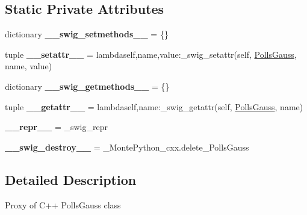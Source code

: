 \subsection*{Static Private Attributes}
\begin{DoxyCompactItemize}
\item 
\hypertarget{classMontePython__cxx_1_1PollsGauss_a8b45d199ff9407d9e15fa619c7988161}{}dictionary {\bfseries \+\_\+\+\_\+swig\+\_\+setmethods\+\_\+\+\_\+} = \{\}\label{classMontePython__cxx_1_1PollsGauss_a8b45d199ff9407d9e15fa619c7988161}

\item 
\hypertarget{classMontePython__cxx_1_1PollsGauss_ae1e5f1466ca7d3bc449f0ca09c0cdee3}{}tuple {\bfseries \+\_\+\+\_\+setattr\+\_\+\+\_\+} = lambdaself,name,value\+:\+\_\+swig\+\_\+setattr(self, \hyperlink{classMontePython__cxx_1_1PollsGauss}{Polls\+Gauss}, name, value)\label{classMontePython__cxx_1_1PollsGauss_ae1e5f1466ca7d3bc449f0ca09c0cdee3}

\item 
\hypertarget{classMontePython__cxx_1_1PollsGauss_a70d46ce4577c9f5183ec44a7185273cd}{}dictionary {\bfseries \+\_\+\+\_\+swig\+\_\+getmethods\+\_\+\+\_\+} = \{\}\label{classMontePython__cxx_1_1PollsGauss_a70d46ce4577c9f5183ec44a7185273cd}

\item 
\hypertarget{classMontePython__cxx_1_1PollsGauss_a22f83c1752260b3b05fef9189c7bec38}{}tuple {\bfseries \+\_\+\+\_\+getattr\+\_\+\+\_\+} = lambdaself,name\+:\+\_\+swig\+\_\+getattr(self, \hyperlink{classMontePython__cxx_1_1PollsGauss}{Polls\+Gauss}, name)\label{classMontePython__cxx_1_1PollsGauss_a22f83c1752260b3b05fef9189c7bec38}

\item 
\hypertarget{classMontePython__cxx_1_1PollsGauss_ab880e47ef637084be9933c9e30bd72a4}{}{\bfseries \+\_\+\+\_\+repr\+\_\+\+\_\+} = \+\_\+swig\+\_\+repr\label{classMontePython__cxx_1_1PollsGauss_ab880e47ef637084be9933c9e30bd72a4}

\item 
\hypertarget{classMontePython__cxx_1_1PollsGauss_ab872fe24e5de69baa7dd32b93b30da1b}{}{\bfseries \+\_\+\+\_\+swig\+\_\+destroy\+\_\+\+\_\+} = \+\_\+\+Monte\+Python\+\_\+cxx.\+delete\+\_\+\+Polls\+Gauss\label{classMontePython__cxx_1_1PollsGauss_ab872fe24e5de69baa7dd32b93b30da1b}

\end{DoxyCompactItemize}


\subsection{Detailed Description}
\begin{DoxyVerb}Proxy of C++ PollsGauss class\end{DoxyVerb}
 

